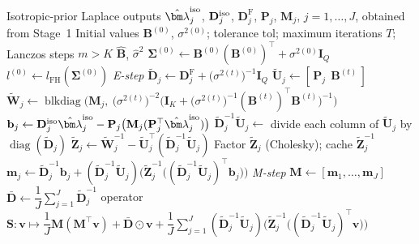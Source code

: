 \begin{algorithm}[htbp]
\caption{FH-EM: maximum-likelihood estimation of $\bm{\Sigma}$}
\label{alg:fhem}
\begin{algorithmic}[1]
\Require Isotropic-prior Laplace outputs $\hat{\bm\lambda}_j^{\rm iso}$, $\mathbf D_j^{\rm iso}$, $\mathbf D_j^{\mathrm F}$, $\mathbf P_j$, $\mathbf M_j$, $j=1,\dots,J$, obtained from Stage~1
\Require Initial values $\mathbf{B}^{(0)}$, $\sigma^{2(0)}$; tolerance $\mathrm{tol}$; maximum iterations $T$; Lanczos steps $m>K$
\Ensure $\hat{\mathbf{B}}$, $\hat\sigma^2$
\State $\bm{\Sigma}^{(0)} \gets \mathbf{B}^{(0)}(\mathbf{B}^{(0)})^{\top} + \sigma^{2(0)}\mathbf{I}_Q$
\State $l^{(0)} \gets l_{\text{FH}}(\bm{\Sigma}^{(0)})$
    \Statex \hspace{\algorithmicindent}\textit{E-step}
        \State $\tilde{\mathbf D}_j \gets \mathbf D_j^{\mathrm F} + \big(\sigma^{2(t)}\big)^{-1}\mathbf I_Q$
        \State $\tilde{\mathbf U}_j \gets [\,\mathbf P_j\ \ \mathbf B^{(t)}\,]$
        \State $\tilde{\mathbf W}_j \gets \operatorname{blkdiag}\Big(\mathbf M_j,\ \big(\sigma^{2(t)}\big)^{-2}\big(\mathbf I_K+\big(\sigma^{2(t)}\big)^{-1}(\mathbf B^{(t)})^\top\mathbf B^{(t)}\big)^{-1}\Big)$
        \State $\mathbf b_j \gets \mathbf D_j^{\rm iso}\hat{\bm\lambda}_j^{\rm iso} - \mathbf P_j\big(\mathbf M_j(\mathbf P_j^\top\hat{\bm\lambda}_j^{\rm iso})\big)$
        \State $\tilde{\mathbf D}_j^{-1}\tilde{\mathbf U}_j \gets$ divide each column of $\tilde{\mathbf U}_j$ by $\operatorname{diag}(\tilde{\mathbf D}_j)$
        \State $\tilde{\mathbf Z}_j \gets \tilde{\mathbf W}_j^{-1} - \tilde{\mathbf U}_j^\top(\tilde{\mathbf D}_j^{-1}\tilde{\mathbf U}_j)$
        \State Factor $\tilde{\mathbf Z}_j$ (Cholesky); cache $\tilde{\mathbf Z}_j^{-1}$
        \State $\mathbf m_j \gets \tilde{\mathbf D}_j^{-1}\mathbf b_j + (\tilde{\mathbf D}_j^{-1}\tilde{\mathbf U}_j)\Big(\tilde{\mathbf Z}_j^{-1}\big((\tilde{\mathbf D}_j^{-1}\tilde{\mathbf U}_j)^\top\mathbf b_j\big)\Big)$
    \EndFor
    \Statex \hspace{\algorithmicindent}\textit{M-step}
    \State $\mathbf M \gets [\mathbf m_1,\dots,\mathbf m_J]$
    \State $\bar{\mathbf D} \gets \dfrac{1}{J}\displaystyle\sum_{j=1}^{J} \tilde{\mathbf D}_j^{-1}$
    \State operator $\mathbf S: \mathbf v \mapsto \dfrac{1}{J}\mathbf M(\mathbf M^\top\mathbf v) + \bar{\mathbf D}\odot\mathbf v + \dfrac{1}{J}\displaystyle\sum_{j=1}^{J}(\tilde{\mathbf D}_j^{-1}\tilde{\mathbf U}_j)\Big(\tilde{\mathbf Z}_j^{-1}\big((\tilde{\mathbf D}_j^{-1}\tilde{\mathbf U}_j)^\top\mathbf v\big)\Big)$

\end{algorithmic}
\end{algorithm}
